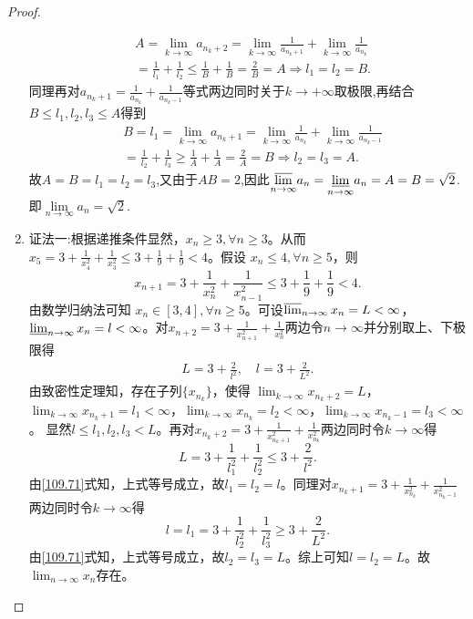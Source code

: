 \documentclass[../../main.tex]{subfiles}
\begin{document}
\begin{proof}
\begin{enumerate}
\begin{align*}
&A=\lim_{k\rightarrow \infty} a_{n_k+2}=\lim_{k\rightarrow \infty} \frac{1}{a_{n_k+1}}+\lim_{k\rightarrow \infty} \frac{1}{a_{n_k}}
\\
&=\frac{1}{l_1}+\frac{1}{l_2}\leqslant \frac{1}{B}+\frac{1}{B}=\frac{2}{B}=A\Rightarrow l_1=l_2=B.
\end{align*}
同理再对$a_{n_k+1}=\frac{1}{a_{n_k}}+\frac{1}{a_{n_k-1}}$等式两边同时关于$k\to+\infty$取极限,再结合$B\leqslant  l_1,l_2,l_3\leqslant  A$得到
\begin{align*}
&B=l_1=\lim_{k\rightarrow \infty} a_{n_k+1}=\lim_{k\rightarrow \infty} \frac{1}{a_{n_k}}+\lim_{k\rightarrow \infty} \frac{1}{a_{n_k-1}}
\\
&=\frac{1}{l_2}+\frac{1}{l_3}\geqslant \frac{1}{A}+\frac{1}{A}=\frac{2}{A}=B\Rightarrow l_2=l_3=A.
\end{align*}
故$A=B=l_1=l_2=l_3$,又由于$AB=2$,因此$\underset{n\rightarrow \infty}{{\varlimsup }}a_n=\underset{n\rightarrow \infty}{{\varliminf }}a_n=A=B=\sqrt{2}$.即$\underset{n\rightarrow \infty}{\lim}a_n=\sqrt{2}$.

\item {\color{blue}证法一:}根据递推条件显然，\(x_n\geqslant 3,\forall n\geqslant 3\)。从而 \(x_5 = 3+\frac{1}{x_{4}^{2}}+\frac{1}{x_{3}^{2}}\leqslant 3+\frac{1}{9}+\frac{1}{9}<4\)。假设 \(x_n\leqslant 4,\forall n\geqslant 5\)，则
\[
x_{n + 1}=3+\frac{1}{x_{n}^{2}}+\frac{1}{x_{n - 1}^{2}}\leqslant 3+\frac{1}{9}+\frac{1}{9}<4.
\]
由数学归纳法可知 \(x_n\in [3,4],\forall n\geqslant 5\)。可设$\varlimsup_{n\rightarrow \infty}x_n=L<\infty$，$\varliminf_{n\rightarrow \infty}x_n=l<\infty$。对$x_{n+2}=3+\frac{1}{x_{n+1}^{2}}+\frac{1}{x_{n}^{2}}$两边令$n\rightarrow \infty$并分别取上、下极限得
\begin{align}
L=3+\frac{2}{l^2},\quad l=3+\frac{2}{L^2}.\label{109.71}
\end{align}
由致密性定理知，存在子列$\{ x_{n_k} \}$，使得
$\lim_{k\rightarrow \infty}x_{n_k+2}=L$，$\lim_{k\rightarrow \infty}x_{n_k+1}=l_1<\infty$，$\lim_{k\rightarrow \infty}x_{n_k}=l_2<\infty$，$\lim_{k\rightarrow \infty}x_{n_k-1}=l_3<\infty$。
显然$l\leqslant l_1,l_2,l_3<L$。再对$x_{n_k+2}=3+\frac{1}{x_{n_k+1}^{2}}+\frac{1}{x_{n_k}^{2}}$两边同时令$k\rightarrow \infty$得
\[
L=3+\frac{1}{l_{1}^{2}}+\frac{1}{l_{2}^{2}}\leqslant 3+\frac{2}{l^2}.
\]
由\eqref{109.71}式知，上式等号成立，故$l_1=l_2=l$。同理对$x_{n_k+1}=3+\frac{1}{x_{n_k}^{2}}+\frac{1}{x_{n_k-1}^{2}}$两边同时令$k\rightarrow \infty$得
\[
l=l_1=3+\frac{1}{l_{2}^{2}}+\frac{1}{l_{3}^{2}}\geqslant 3+\frac{2}{L^2}.
\]
由\eqref{109.71}式知，上式等号成立，故$l_2=l_3=L$。综上可知$l=l_2=L$。故$\lim_{n\rightarrow \infty}x_n$存在。


\end{enumerate}
\end{proof}
\end{document}

